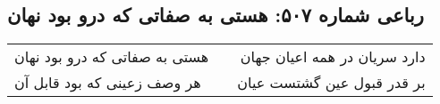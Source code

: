 \begin{center}
\section*{رباعی شماره ۵۰۷: هستی به صفاتی که درو بود نهان}
\label{sec:sh507}
\begin{longtable}{l p{0.5cm} r}
هستی به صفاتی که درو بود نهان
&&
دارد سریان در همه اعیان جهان
\\
هر وصف زعینی که بود قابل آن
&&
بر قدر قبول عین گشتست عیان
\\
\end{longtable}
\end{center}
